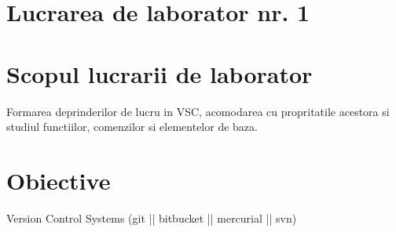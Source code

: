 \section*{Lucrarea de laborator nr. 1}

\section{Scopul lucrarii de laborator}
Formarea deprinderilor de lucru in VSC, acomodarea cu propritatile acestora si studiul functiilor, comenzilor si elementelor de baza.
\section{Obiective}

Version Control Systems (git || bitbucket || mercurial || svn)

